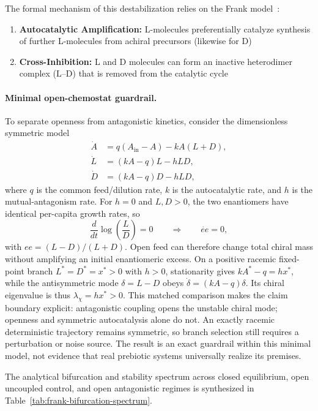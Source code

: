 \documentclass[12pt,a4paper]{article}
\theoremstyle{remark}
\begin{document}
The formal mechanism of this destabilization relies on the Frank model~\citep{Frank1953}:
\begin{enumerate}
    \item \textbf{Autocatalytic Amplification:} L-molecules preferentially catalyze synthesis of further L-molecules from achiral precursors (likewise for D)
    \item \textbf{Cross-Inhibition:} L and D molecules can form an inactive heterodimer complex ($\mathrm{L}$--$\mathrm{D}$) that is removed from the catalytic cycle~\citep{Biochirality}
\end{enumerate}

\paragraph{Minimal open-chemostat guardrail.}
To separate openness from antagonistic kinetics, consider the dimensionless symmetric model
\begin{align}
    \dot A &= q(A_{\mathrm{in}}-A)-kA(L+D), \\
    \dot L &= (kA-q)L-hLD, \\
    \dot D &= (kA-q)D-hLD,
\end{align}
where $q$ is the common feed/dilution rate, $k$ is the autocatalytic rate, and $h$ is the mutual-antagonism rate. For $h=0$ and $L,D>0$, the two enantiomers have identical per-capita growth rates, so
\begin{equation}
    \frac{d}{dt}\log\!\left(\frac{L}{D}\right)=0
    \qquad\Longrightarrow\qquad
    \dot{ee}=0,
\end{equation}
with $ee=(L-D)/(L+D)$. Open feed can therefore change total chiral mass without amplifying an initial enantiomeric excess. On a positive racemic fixed-point branch $L^*=D^*=x^*>0$ with $h>0$, stationarity gives $kA^*-q=h x^*$, while the antisymmetric mode $\delta=L-D$ obeys $\dot\delta=(kA-q)\delta$. Its chiral eigenvalue is thus $\lambda_{\chi}=h x^*>0$. This matched comparison makes the claim boundary explicit: antagonistic coupling opens the unstable chiral mode; openness and symmetric autocatalysis alone do not. An exactly racemic deterministic trajectory remains symmetric, so branch selection still requires a perturbation or noise source. The result is an exact guardrail within this minimal model, not evidence that real prebiotic systems universally realize its premises.

The analytical bifurcation and stability spectrum across closed equilibrium, open uncoupled control, and open antagonistic regimes is synthesized in Table~\ref{tab:frank-bifurcation-spectrum}.
\end{document}

